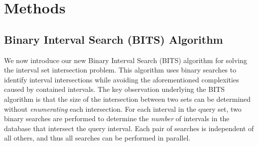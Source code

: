 \documentclass{bioinfo}
\begin{document}
	
	

	



	\section{Methods}
	
	\subsection{Binary Interval Search (BITS) Algorithm}
	We now introduce our new Binary Interval Search (BITS) algorithm for solving
	the interval set intersection problem.  This algorithm uses binary searches
	to identify interval intersections while avoiding the aforementioned
	complexities caused by contained intervals. The key observation underlying the BITS 
	algorithm is that the size of the intersection between two sets can be 
	determined without \emph{enumerating} each intersection.  For each interval 
	in the query set, two binary searches are performed to determine the \emph{number} 
	of intervals in the database that intersect the query interval.  Each pair of
	searches is independent of all others, and thus all searches can be
	performed in parallel.  
	
\end{document}
